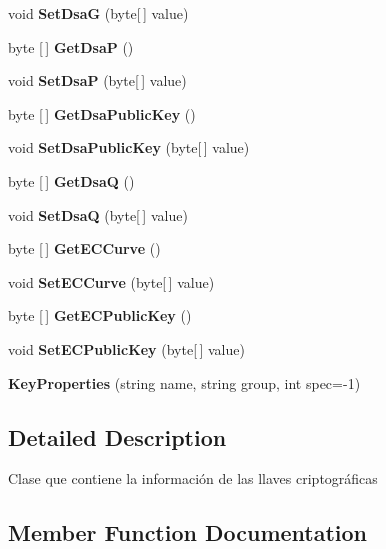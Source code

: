 \begin{DoxyCompactItemize}
\mbox{\label{class_cxi_cega_1_1_key_properties_a5ed64f6f87f9eb18f7f0e303b218dbb6}} 
void {\bfseries Set\+DsaG} (byte[$\,$] value)
\item 
\mbox{\label{class_cxi_cega_1_1_key_properties_a41b63cc501e3f1a8f80c27665caf51bb}} 
byte [$\,$] {\bfseries Get\+DsaP} ()
\item 
\mbox{\label{class_cxi_cega_1_1_key_properties_a4d320ea23a3f81eb465aed5257763f83}} 
void {\bfseries Set\+DsaP} (byte[$\,$] value)
\item 
\mbox{\label{class_cxi_cega_1_1_key_properties_a2726125da0cee5ac0fca6e7b6c0c0474}} 
byte [$\,$] {\bfseries Get\+Dsa\+Public\+Key} ()
\item 
\mbox{\label{class_cxi_cega_1_1_key_properties_adf84b85d313ce2cf40100a9a5cfe084d}} 
void {\bfseries Set\+Dsa\+Public\+Key} (byte[$\,$] value)
\item 
\mbox{\label{class_cxi_cega_1_1_key_properties_ade476ed441d3fb00dc1d0b9f6d1b8b80}} 
byte [$\,$] {\bfseries Get\+DsaQ} ()
\item 
\mbox{\label{class_cxi_cega_1_1_key_properties_aeb4c0495655370c7fccce5db11d77a00}} 
void {\bfseries Set\+DsaQ} (byte[$\,$] value)
\item 
\mbox{\label{class_cxi_cega_1_1_key_properties_a7475526445faaf5f9b4fee362e9fe776}} 
byte [$\,$] {\bfseries Get\+E\+C\+Curve} ()
\item 
\mbox{\label{class_cxi_cega_1_1_key_properties_ab9050b61762df84823bcf5cb540c8653}} 
void {\bfseries Set\+E\+C\+Curve} (byte[$\,$] value)
\item 
\mbox{\label{class_cxi_cega_1_1_key_properties_a9ce2bf8e0f8cd57a29d2a0a41e40ffdc}} 
byte [$\,$] {\bfseries Get\+E\+C\+Public\+Key} ()
\item 
\mbox{\label{class_cxi_cega_1_1_key_properties_ada17bce0795551581564f1be484ff5e6}} 
void {\bfseries Set\+E\+C\+Public\+Key} (byte[$\,$] value)
\item 
\mbox{\label{class_cxi_cega_1_1_key_properties_a566cc260169f7151e3e0091acf9b441b}} 
{\bfseries Key\+Properties} (string name, string group, int spec=-\/1)
\end{DoxyCompactItemize}


\subsection{Detailed Description}
Clase que contiene la información de las llaves criptográficas 



\subsection{Member Function Documentation}
\mbox{\label{class_cxi_cega_1_1_key_properties_acc0ba151f6e46aaebf5cc85576fc35f7}} 
